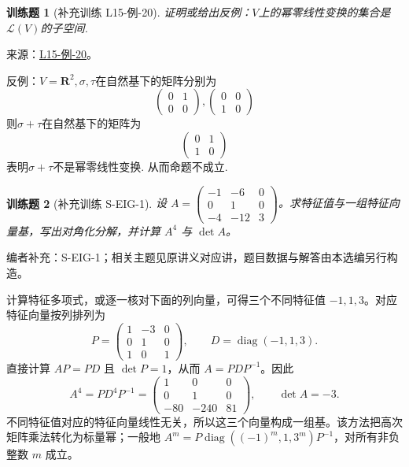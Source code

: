 \documentclass[UTF8,12pt,a4paper,fontset=fandol]{ctexart}
\newtheorem{exercise}{训练题}[section]
\begin{document}
\begin{exercise}[补充训练 L15-例-20]\label{prob:L15-例-20}
证明或给出反例：$V$上的幂零线性变换的集合是$\mathcal{L}(V)$的子空间.
\end{exercise}
\noindent 来源：\href{https://github.com/yhwu-is/Linear-Algebra-Left-Undone/blob/new/%E8%AE%B2%E4%B9%89/%E4%B8%93%E9%A2%98/15%20%E7%9B%B8%E4%BC%BC%E6%A0%87%E5%87%86%E5%BD%A2%EF%BC%9A%E5%A4%8D%E6%95%B0%E5%9F%9F%E4%B8%8A%E7%9A%84%E5%B0%9D%E8%AF%95%E4%B8%8E%E7%90%86%E8%AE%BA.tex}{L15-例-20}。
\begin{solve}
反例：$V=\mathbf{R}^2,\sigma,\tau$在自然基下的矩阵分别为
            \[ \begin{pmatrix}
                0 & 1 \\
                0 & 0
            \end{pmatrix},
            \begin{pmatrix}
                0 & 0 \\
                1 & 0
            \end{pmatrix}\]
            则$\sigma+\tau$在自然基下的矩阵为
            \[ \begin{pmatrix}
                0 & 1 \\
                1 & 0
            \end{pmatrix} \]
            表明$\sigma+\tau$不是幂零线性变换. 从而命题不成立.
\end{solve}

\begin{exercise}[补充训练 S-EIG-1]\label{prob:S-EIG-1}
设 $A=\begin{pmatrix}-1&-6&0\\0&1&0\\-4&-12&3\end{pmatrix}$。求特征值与一组特征向量基，写出对角化分解，并计算 $A^4$ 与 $\det A$。
\end{exercise}
\noindent 编者补充：S-EIG-1；相关主题见原讲义对应讲，题目数据与解答由本选编另行构造。
\begin{solve}
计算特征多项式，或逐一核对下面的列向量，可得三个不同特征值 $-1,1,3$。对应特征向量按列排列为
\[P=\begin{pmatrix}1&-3&0\\0&1&0\\1&0&1\end{pmatrix},\qquad D=\operatorname{diag}(-1,1,3).\]
直接计算 $AP=PD$ 且 $\det P=1$，从而 $A=PDP^{-1}$。因此
\[A^4=PD^4P^{-1}=\begin{pmatrix}1&0&0\\0&1&0\\-80&-240&81\end{pmatrix},\qquad \det A=-3.\]
不同特征值对应的特征向量线性无关，所以这三个向量构成一组基。该方法把高次矩阵乘法转化为标量幂；一般地 $A^m=P\operatorname{diag}((-1)^m,1,3^m)P^{-1}$，对所有非负整数 $m$ 成立。
\end{solve}
\end{document}
